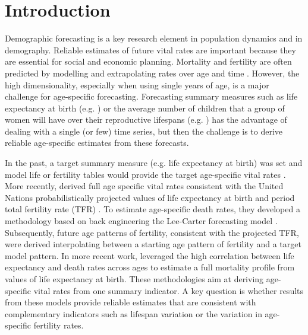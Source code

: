 \documentclass[12pt,a4paper,twoside]{article}
\begin{document}
	
	
	

	\newpage
\setcounter{page}{1}	

\section{Introduction}\label{sec:Intro}

Demographic forecasting is a key research element in population dynamics and in demography. Reliable estimates of future vital rates are important because they are essential for social and economic planning. Mortality and fertility are often predicted by modelling and extrapolating rates over age and time \citep{Booth2006,bohk2018forecast}. However, the high dimensionality, especially when using single years of age, is a major challenge for age-specific forecasting. Forecasting summary measures such as life expectancy at birth (e.g. \citet{pascariu2018double}) or the average number of children that a group of women will have over their reproductive lifespans (e.g. \citet{alkema2011probabilistic}) has the advantage of dealing with a single (or few) time series, but then the challenge is to derive reliable age-specific estimates from these forecasts. 

In the past, a target summary measure (e.g. life expectancy at birth) was set and model life or fertility tables would provide the target age-specific vital rates \citep{Booth2006}. More recently, \citet{vsevvcikova2016age} derived full age specific vital rates consistent with the United Nations probabilistically projected values of life expectancy at birth and period total fertility rate (TFR) \citep{gerland2014WorldPopulationStabilization}. To estimate age-specific death rates, they developed a methodology based on back engineering the Lee-Carter forecasting model \citep{lee1992modeling}. Subsequently, future age patterns of fertility, consistent with the projected TFR, were derived interpolating between a starting age pattern of fertility and a target model pattern. In more recent work, \citet{pascariu2020linear} leveraged the high correlation between life expectancy and death rates across ages to estimate a full mortality profile from values of life expectancy at birth. These methodologies aim at deriving age-specific vital rates from one summary indicator. A key question is whether results from these models provide reliable estimates that are consistent with complementary indicators such as lifespan variation or the variation in age-specific fertility rates. 
\end{document}
